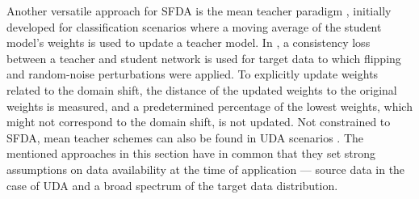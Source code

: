         Another versatile approach for SFDA is the mean teacher paradigm \citep{tarvainen2017mean}, initially developed for classification scenarios where a moving average of the student model’s weights is used to update a teacher model. In \citep{wen2023source}, a consistency loss between a teacher and student network is used for target data to which flipping and random-noise perturbations were applied. To explicitly update weights related to the domain shift, the distance of the updated weights to the original weights is measured, and a predetermined percentage of the lowest weights, which might not correspond to the domain shift, is not updated. Not constrained to SFDA, mean teacher schemes can also be found in UDA scenarios \citep{perone2019unsupervised}.
        The mentioned approaches in this section have in common that they set strong assumptions on data availability at the time of application --- source data in the case of UDA and a broad spectrum of the target data distribution.


